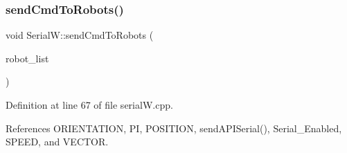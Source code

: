 \subsubsection{\texorpdfstring{send\+Cmd\+To\+Robots()}{sendCmdToRobots()}}
{\footnotesize\ttfamily void Serial\+W\+::send\+Cmd\+To\+Robots (\begin{DoxyParamCaption}\item[{std\+::vector$<$ Robot $>$}]{robot\+\_\+list }\end{DoxyParamCaption})}



Definition at line 67 of file serial\+W.\+cpp.



References O\+R\+I\+E\+N\+T\+A\+T\+I\+ON, PI, P\+O\+S\+I\+T\+I\+ON, send\+A\+P\+I\+Serial(), Serial\+\_\+\+Enabled, S\+P\+E\+ED, and V\+E\+C\+T\+OR.


